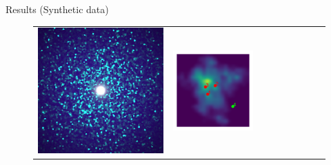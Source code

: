 \documentclass[final]{beamer}
\newlength{\twocolwid}
\newlength{\resultwidth}
\begin{document}
\begin{frame}[t]
\begin{columns}[t]
\begin{column}{\twocolwid}
\begin{block}{Results (Synthetic data)}
\begin{figure}[t]
\begin{tabular}{ccrclcccc}
            		\includegraphics[width=\resultwidth]{images/synth/flake/optim.jpg} &
            		\includegraphics[width=\resultwidth]{images/synth/flake/posterior.pdf} &

\end{tabular}
\end{figure}
\end{block}
\end{column}
\end{columns}
\end{frame}
\end{document}
